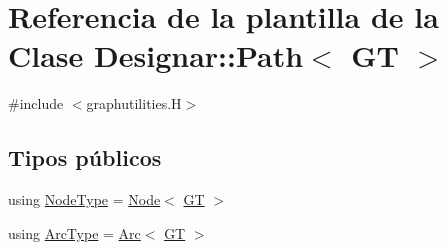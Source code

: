 \hypertarget{class_designar_1_1_path}{}\section{Referencia de la plantilla de la Clase Designar\+:\+:Path$<$ GT $>$}
\label{class_designar_1_1_path}


{\ttfamily \#include $<$graphutilities.\+H$>$}

\subsection*{Tipos públicos}
\begin{DoxyCompactItemize}
\item 
using \hyperlink{class_designar_1_1_path_a7b499fd50e96e3360968d4cfef7a3736}{Node\+Type} = \hyperlink{namespace_designar_a5af326c65aa2bd26b26c410f2030d09e}{Node}$<$ \hyperlink{demo-buildgraph_8_c_a3001c40d2c31ca87ed96cd7d1334a55e}{GT} $>$
\item 
using \hyperlink{class_designar_1_1_path_a6e13966351659cedcf3233098b2b7384}{Arc\+Type} = \hyperlink{namespace_designar_a3f55fb5513d62ff47cbc8f72b8e95d6f}{Arc}$<$ \hyperlink{demo-buildgraph_8_c_a3001c40d2c31ca87ed96cd7d1334a55e}{GT} $>$
\end{DoxyCompactItemize}
